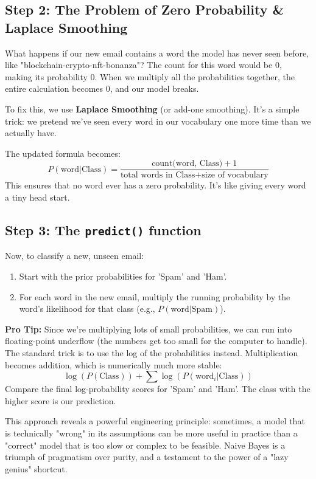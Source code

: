 \documentclass[11pt, letterpaper, openany]{book}
\begin{document}
\subsection{Step 2: The Problem of Zero Probability \& Laplace Smoothing}

What happens if our new email contains a word the model has never seen before, like "blockchain-crypto-nft-bonanza"? The count for this word would be 0, making its probability 0. When we multiply all the probabilities together, the entire calculation becomes 0, and our model breaks.

To fix this, we use \textbf{Laplace Smoothing} (or add-one smoothing). It's a simple trick: we pretend we've seen every word in our vocabulary one more time than we actually have.

The updated formula becomes:
\[ P(\text{word}|\text{Class}) = \frac{\text{count(word, Class)} + 1}{\text{total words in Class} + \text{size of vocabulary}} \]
This ensures that no word ever has a zero probability. It's like giving every word a tiny head start.

\subsection{Step 3: The \texttt{predict()} function}

Now, to classify a new, unseen email:
\begin{enumerate}
    \item Start with the prior probabilities for 'Spam' and 'Ham'.
    \item For each word in the new email, multiply the running probability by the word's likelihood for that class (e.g., $P(\text{word}|\text{Spam})$).
\end{enumerate}
\textbf{Pro Tip:} Since we're multiplying lots of small probabilities, we can run into floating-point underflow (the numbers get too small for the computer to handle). The standard trick is to use the log of the probabilities instead. Multiplication becomes addition, which is numerically much more stable:
\[ \log(P(\text{Class})) + \sum \log(P(\text{word}_i|\text{Class})) \]
Compare the final log-probability scores for 'Spam' and 'Ham'. The class with the higher score is our prediction.

This approach reveals a powerful engineering principle: sometimes, a model that is technically "wrong" in its assumptions can be more useful in practice than a "correct" model that is too slow or complex to be feasible. Naive Bayes is a triumph of pragmatism over purity, and a testament to the power of a "lazy genius" shortcut.
\end{document}
